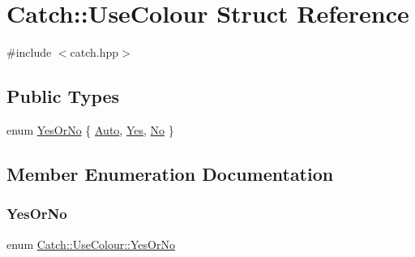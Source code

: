 \hypertarget{struct_catch_1_1_use_colour}{}\section{Catch\+::Use\+Colour Struct Reference}
\label{struct_catch_1_1_use_colour}


{\ttfamily \#include $<$catch.\+hpp$>$}

\subsection*{Public Types}
\begin{DoxyCompactItemize}
\item 
enum \mbox{\hyperlink{struct_catch_1_1_use_colour_a6aa78da0c2de7539bb9e3757e204a3f1}{Yes\+Or\+No}} \{ \mbox{\hyperlink{struct_catch_1_1_use_colour_a6aa78da0c2de7539bb9e3757e204a3f1a5c7fa9f5f5536187e8f47df35b892bb7}{Auto}}, 
\mbox{\hyperlink{struct_catch_1_1_use_colour_a6aa78da0c2de7539bb9e3757e204a3f1ad7bb64e0fe49ba51aafbd3e14f06e98d}{Yes}}, 
\mbox{\hyperlink{struct_catch_1_1_use_colour_a6aa78da0c2de7539bb9e3757e204a3f1af80533ce38685131ea8d7a6360ce9e57}{No}}
 \}
\end{DoxyCompactItemize}


\subsection{Member Enumeration Documentation}
\mbox{\label{struct_catch_1_1_use_colour_a6aa78da0c2de7539bb9e3757e204a3f1}} 
\subsubsection{\texorpdfstring{YesOrNo}{YesOrNo}}
{\footnotesize\ttfamily enum \mbox{\hyperlink{struct_catch_1_1_use_colour_a6aa78da0c2de7539bb9e3757e204a3f1}{Catch\+::\+Use\+Colour\+::\+Yes\+Or\+No}}}

